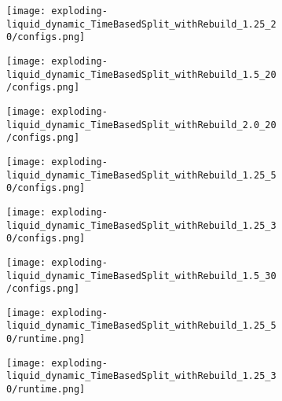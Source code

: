 \documentclass[]{article}
\begin{document}
\begin{figure}[H]
	\begin{center}
		\begin{subfigure}[b]{0.3\textwidth}
			\texttt{[image: exploding-liquid\_dynamic\_TimeBasedSplit\_withRebuild\_1.25\_20/configs.png]}
		\end{subfigure}
		\begin{subfigure}[b]{0.3\textwidth}
			\texttt{[image: exploding-liquid\_dynamic\_TimeBasedSplit\_withRebuild\_1.5\_20/configs.png]}
		\end{subfigure}
		\begin{subfigure}[b]{0.3\textwidth}
			\texttt{[image: exploding-liquid\_dynamic\_TimeBasedSplit\_withRebuild\_2.0\_20/configs.png]}
		\end{subfigure}
	\end{center}
	\begin{center}
		\begin{subfigure}[b]{0.3\textwidth}
			\texttt{[image: exploding-liquid\_dynamic\_TimeBasedSplit\_withRebuild\_1.25\_50/configs.png]}
		\end{subfigure}
		\begin{subfigure}[b]{0.3\textwidth}
			\texttt{[image: exploding-liquid\_dynamic\_TimeBasedSplit\_withRebuild\_1.25\_30/configs.png]}
		\end{subfigure}
		\begin{subfigure}[b]{0.3\textwidth}
			\texttt{[image: exploding-liquid\_dynamic\_TimeBasedSplit\_withRebuild\_1.5\_30/configs.png]}
		\end{subfigure}
	\end{center}
	\begin{center}
		\begin{subfigure}[b]{0.3\textwidth}
			\texttt{[image: exploding-liquid\_dynamic\_TimeBasedSplit\_withRebuild\_1.25\_50/runtime.png]}
		\end{subfigure}
		\begin{subfigure}[b]{0.3\textwidth}
			\texttt{[image: exploding-liquid\_dynamic\_TimeBasedSplit\_withRebuild\_1.25\_30/runtime.png]}

\end{subfigure}
\end{center}
\end{figure}
\end{document}
